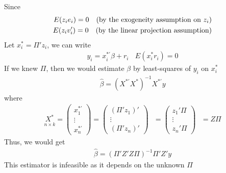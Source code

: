\documentclass[a4paper,twoside,11pt]{article}
\begin{document}
Since
\begin{equation*}
\begin{aligned}
E(z_i e_i) = 0 \ \ \ (\textmd{by the exogeneity assumption on } z_i) \\
E(z_i v_i') = 0 \ \ \ (\textmd{by the linear projection assumption})
\end{aligned} 
\end{equation*}
Let $x_i^* = \Pi' z_i$, we can write
\begin{equation*}
\begin{aligned}
y_i = x_i^{*'} \beta + r_i \ \ \ \ E(x_i^* r_i) = 0
\end{aligned} 
\end{equation*}
If we knew $\Pi$, then we would estimate $\beta$ by least-squares of $y_i$ on $x_i^*$
\begin{equation*}
\begin{aligned}
\hat{\beta} = (X^{*'} X^*)^{-1} X^{*'} y
\end{aligned} 
\end{equation*}
where
\begin{equation*}
\begin{aligned}
\underset{n \times k}{X^*} = \begin{pmatrix}
x_1^{*'} \\
\vdots \\
x_n^{*'}
\end{pmatrix} = \begin{pmatrix}
(\Pi' z_1)' \\
\vdots \\
(\Pi' z_n)'
\end{pmatrix} \ \ \ = \begin{pmatrix}
z_1' \Pi \\
\vdots \\
z_n' \Pi
\end{pmatrix} \ \ \ = Z \Pi
\end{aligned} 
\end{equation*}
Thus, we would get
\begin{equation*}
\begin{aligned}
\hat{\beta} = (\Pi' Z'Z \Pi)^{-1} \Pi' Z'y
\end{aligned} 
\end{equation*}
This estimator is infeasible as it depends on the unknown $\Pi$
\end{document}

